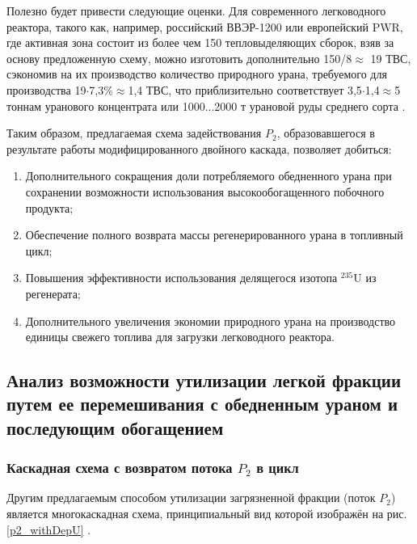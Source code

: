 Полезно будет привести следующие оценки. Для современного легководного реактора, такого как, например, российский ВВЭР-1200 или европейский PWR, где активная зона состоит из более чем 150 тепловыделяющих сборок, взяв за основу предложенную схему, можно изготовить дополнительно 150/8$\approx$ 19 ТВС, сэкономив на их производство количество природного урана, требуемого для производства 19$\cdot$7,3\%$\approx$1,4 ТВС, что приблизительно соответствует 3,5$\cdot$1,4$\approx$5 тоннам уранового концентрата или 1000...2000 т урановой руды среднего сорта \cite{bekmanYaDERNAYaFIZIKA}.

Таким образом, предлагаемая схема задействования $P_2$, образовавшегося в результате работы модифицированного двойного каскада, позволяет добиться:
\begin{enumerate}
  \item Дополнительного сокращения доли потребляемого обедненного урана при сохранении возможности использования высокообогащенного побочного продукта;
  \item Обеспечение полного возврата массы регенерированного урана в топливный цикл;
  \item Повышения эффективности использования делящегося изотопа $^{235}$U из регенерата;
  \item Дополнительного увеличения экономии природного урана на производство единицы свежего топлива для загрузки легководного реактора.
\end{enumerate}

\subsection{Анализ возможности утилизации легкой фракции путем ее перемешивания с обедненным ураном и последующим обогащением}
\subsubsection{Каскадная схема с возвратом потока $P_2$ в цикл}

Другим предлагаемым способом утилизации загрязненной фракции (поток $P_2$) является многокаскадная схема, принципиальный вид которой изображён на рис. \ref{p2_withDepU} \cite{smirnovApplyingEnrichmentCapacities2018}.

